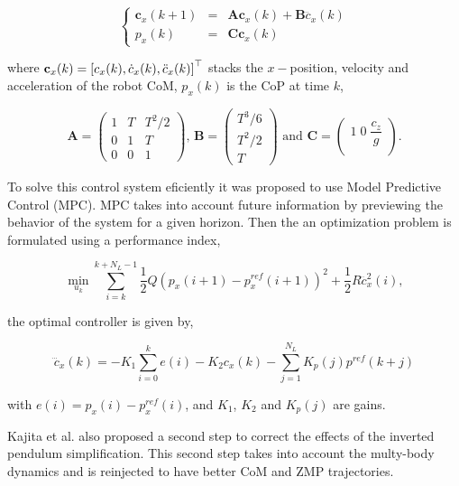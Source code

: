 $$
\left\{
\begin{array}{ccc}
 {\mathbf c}_x(k+1) &=& {\mathbf A} {\mathbf c}_x(k) + {\mathbf B} \dddot{c}_x(k)\\
 p_x(k) &=& {\mathbf C} {\mathbf c}_x(k)
\end{array}
\right.
$$

where ${\mathbf c}_x(k) = \left[ c_x(k), \dot{c}_x(k), \ddot{c}_x(k) \right]^{\top}$ stacks the $x-$position, velocity and acceleration of the robot CoM, $p_x(k)$ is the CoP at time $k$,

\begin{equation*}
{\mathbf A} = \left(
\begin{matrix}
1 & T & T^2/2 \\
0 & 1 & T \\
0 & 0 & 1
\end{matrix}
\right) \text{, }
{\mathbf B} = \left(
\begin{matrix}
T^3/6 \\
T^2/2 \\
T
\end{matrix}
\right) \text{ and }
{\mathbf C} = \left(
\begin{matrix}
1 \; 0 \; \dfrac{c_z}{g} \\
\end{matrix}
\right).
\end{equation*}

To solve this control system eficiently it was proposed to use Model Predictive Control (MPC). MPC takes into account future information by previewing the behavior of the system for a given horizon. Then the an optimization problem is formulated using a performance index,

\begin{equation}
\min_{u_k} \sum\limits_{i=k}^{k+N_L - 1} \frac{1}{2} Q (p_x(i+1) - p_x^{ref}(i+1))^2 + \frac{1}{2}R\dddot{c}_x^2(i),
\end{equation}

the optimal controller is given by,

\begin{equation}
\dddot{c}_x(k) = -K_1 \sum\limits_{i=0}^{k} e(i)-K_2c_x(k) - \sum\limits_{j=1}^{N_L} K_p(j)p^{ref}(k+j)
\end{equation}

with $e(i) = p_x(i) - p_x^{ref}(i)$, and $K_1$, $K_2$ and $K_p(j)$ are gains.

Kajita et al. also proposed a second step to correct the effects of the inverted pendulum simplification. This second step takes into account the multy-body dynamics and is reinjected to have better CoM and ZMP trajectories.

